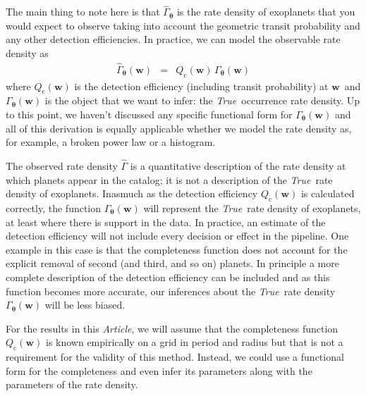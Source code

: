 \documentclass[12pt,preprint]{aastex}
\newcommand{\paper}{\textsl{Article}}
\newcommand{\foreign}[1]{\emph{#1}}
\newcommand{\True}{\foreign{True}}
\newcommand{\eqlabel}[1]{\label{eq:#1}}
\newcommand{\bvec}[1]{\ensuremath{\boldsymbol{#1}}}
\newcommand{\rate}{\ensuremath{\Gamma}}
\newcommand{\ratepar}{{\ensuremath{\theta}}}
\newcommand{\ratepars}{{\ensuremath{\bvec{\ratepar}}}}
\newcommand{\obs}[1]{\ensuremath{\hat{#1}}}
\newcommand{\completeness}{{\ensuremath{Q_\mathrm{c}}}}
\newcommand{\entry}{{\ensuremath{\bvec{w}}}}
\begin{document}
The main thing to note here is that $\obs{\rate}_\ratepars$ is the rate
density of exoplanets that you would expect to observe taking into account the
geometric transit probability and any other detection efficiencies.
In practice, we can model the observable rate density as
\begin{eqnarray}\eqlabel{obs-rate}
\obs{\rate}_\ratepars(\entry) &=&
    \completeness(\entry)\,\rate_\ratepars(\entry)
\end{eqnarray}
where $\completeness(\entry)$ is the detection efficiency (including transit
probability) at \entry\ and $\rate_\ratepars(\entry)$ is the object that we
want to infer: the \True\ occurrence rate density.
Up to this point, we haven't discussed any specific functional form for
$\rate_\ratepars(\entry)$ and all of this derivation is equally applicable
whether we model the rate density as, for example, a broken power law or
a histogram.

The observed rate density \obs{\rate} is a quantitative description of the
rate density at which planets appear in the \citet{petigura} catalog; it is
not a description of the \True\ rate density of exoplanets.
Inasmuch as the detection efficiency $\completeness(\entry)$ is calculated
correctly, the function $\rate_\ratepars(\entry)$ will represent the \True\
rate density of exoplanets, at least where there is support in the data.
In practice, an estimate of the detection efficiency will not include every
decision or effect in the pipeline.
One example in this case is that the completeness function does not account
for the explicit removal of second (and third, and so on) planets.
In principle a more complete description of the detection efficiency can be
included and as this function becomes more accurate, our inferences about the
\True\ rate density $\rate_\ratepars(\entry)$ will be less biased.

For the results in this \paper, we will assume that the completeness function
$\completeness(\entry)$ is known empirically on a grid in period and radius
but that is not a requirement for the validity of this method.
Instead, we could use a functional form for the completeness and even infer
its parameters along with the parameters of the rate density.
\end{document}
